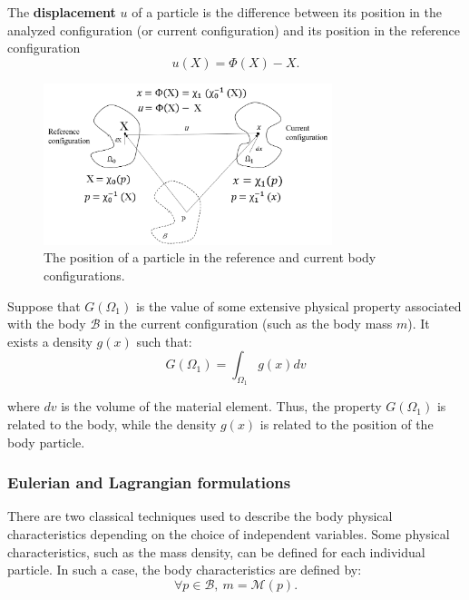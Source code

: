  The \textbf{displacement} $u$ of a particle is the difference between its position in the analyzed configuration (or current configuration) and its position in the reference configuration
 \begin{equation}
 u(X) = \Phi(X) - X.
 \end{equation}


\begin{figure}
\begin{center}
\includegraphics[width=0.75\textwidth,keepaspectratio]{figures/referenceFig.png} 
\caption{ The position of a particle in the reference and current body configurations.}
\label{reference_config_theory}
\end{center}
\end{figure}

Suppose that $G(\Omega_1)$ is the value of some extensive physical property  associated with the body $\mathcal{B}$ in the current configuration (such as the body mass $m$). It exists a density $g(x)$ such that:
\begin{equation}
 G(\Omega_1) = \int_{\Omega_1} g(x)dv
\end{equation} 

 where $dv$ is the volume of the material element.
 Thus, the property $G(\Omega_1)$ is related to the body, while the density $g(x)$ is related to the position of the body particle.
\subsubsection*{Eulerian and Lagrangian formulations}
There are two classical techniques used to describe the body physical characteristics depending on the choice of independent variables.
 Some physical characteristics, such as the mass density, can be defined for each individual particle. In such a case, the body characteristics are defined by: 
\begin{equation}
\forall	p \in \mathcal{B}, \ m = \mathcal{M}(p).
\end{equation} 

